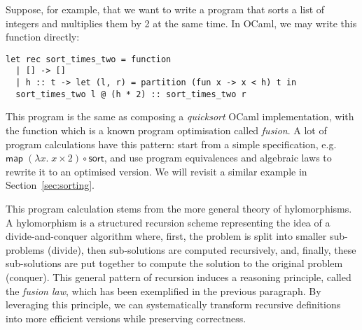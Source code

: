 \documentclass[a4paper,UKenglish,cleveref, autoref, thm-restate]{lipics-v2021}
\begin{document}
Suppose, for example, that we want to write a program that sorts a list of
integers and multiplies them by 2 at the same time. In OCaml, we may write this
function directly:
\begin{verbatim}
let rec sort_times_two = function
  | [] -> []
  | h :: t -> let (l, r) = partition (fun x -> x < h) t in
  sort_times_two l @ (h * 2) :: sort_times_two r
\end{verbatim}

This program is the same as composing a \emph{quicksort} OCaml implementation,
with the function  which is a known program
optimisation called \emph{fusion}.  A lot of program calculations have this
pattern: start from a simple specification, e.g.\
$\mathsf{map}\;(\lambda x.\;x \times 2) \circ \mathsf{sort}$, and use program
equivalences and algebraic laws to rewrite it to an optimised version. We will
revisit a similar example in Section~\ref{sec:sorting}.

This program calculation stems from the more general theory of hylomorphisms. A
hylomorphism is a structured recursion scheme representing the idea of a
divide-and-conquer algorithm where, first, the problem is split into smaller
sub-problems (divide), then sub-solutions are computed recursively, and,
finally, these sub-solutions are put together to compute the solution to the
original problem (conquer). This general pattern of recursion induces a
reasoning principle, called the \emph{fusion law}, which has been exemplified in
the previous paragraph. By leveraging this principle, we can systematically
transform recursive definitions into more efficient versions while preserving
correctness.
\end{document}

